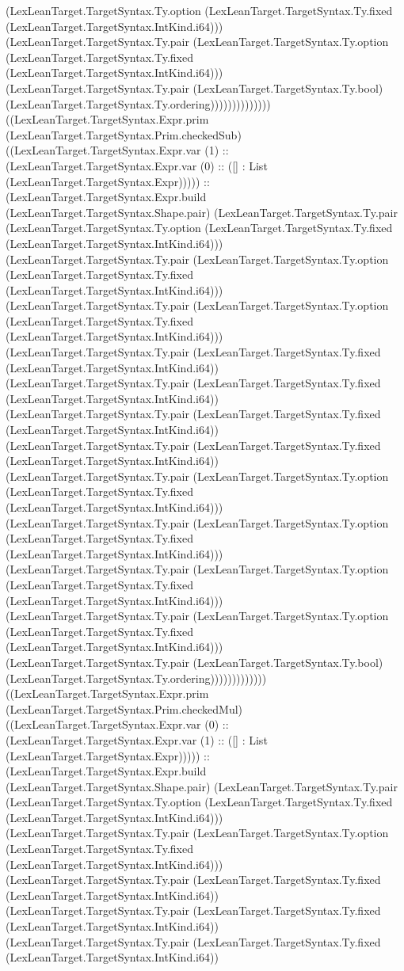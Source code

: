 \documentclass[11pt]{article}
\begin{document}
(LexLeanTarget.TargetSyntax.Ty.option (LexLeanTarget.TargetSyntax.Ty.fixed (LexLeanTarget.TargetSyntax.IntKind.i64))) (LexLeanTarget.TargetSyntax.Ty.pair (LexLeanTarget.TargetSyntax.Ty.option (LexLeanTarget.TargetSyntax.Ty.fixed (LexLeanTarget.TargetSyntax.IntKind.i64))) (LexLeanTarget.TargetSyntax.Ty.pair (LexLeanTarget.TargetSyntax.Ty.bool) (LexLeanTarget.TargetSyntax.Ty.ordering)))))))))))))) ((LexLeanTarget.TargetSyntax.Expr.prim (LexLeanTarget.TargetSyntax.Prim.checkedSub) ((LexLeanTarget.TargetSyntax.Expr.var (1) :: (LexLeanTarget.TargetSyntax.Expr.var (0) :: ([] : List (LexLeanTarget.TargetSyntax.Expr))))) :: (LexLeanTarget.TargetSyntax.Expr.build (LexLeanTarget.TargetSyntax.Shape.pair) (LexLeanTarget.TargetSyntax.Ty.pair (LexLeanTarget.TargetSyntax.Ty.option (LexLeanTarget.TargetSyntax.Ty.fixed (LexLeanTarget.TargetSyntax.IntKind.i64))) (LexLeanTarget.TargetSyntax.Ty.pair (LexLeanTarget.TargetSyntax.Ty.option (LexLeanTarget.TargetSyntax.Ty.fixed (LexLeanTarget.TargetSyntax.IntKind.i64))) (LexLeanTarget.TargetSyntax.Ty.pair (LexLeanTarget.TargetSyntax.Ty.option (LexLeanTarget.TargetSyntax.Ty.fixed (LexLeanTarget.TargetSyntax.IntKind.i64))) (LexLeanTarget.TargetSyntax.Ty.pair (LexLeanTarget.TargetSyntax.Ty.fixed (LexLeanTarget.TargetSyntax.IntKind.i64)) (LexLeanTarget.TargetSyntax.Ty.pair (LexLeanTarget.TargetSyntax.Ty.fixed (LexLeanTarget.TargetSyntax.IntKind.i64)) (LexLeanTarget.TargetSyntax.Ty.pair (LexLeanTarget.TargetSyntax.Ty.fixed (LexLeanTarget.TargetSyntax.IntKind.i64)) (LexLeanTarget.TargetSyntax.Ty.pair (LexLeanTarget.TargetSyntax.Ty.fixed (LexLeanTarget.TargetSyntax.IntKind.i64)) (LexLeanTarget.TargetSyntax.Ty.pair (LexLeanTarget.TargetSyntax.Ty.option (LexLeanTarget.TargetSyntax.Ty.fixed (LexLeanTarget.TargetSyntax.IntKind.i64))) (LexLeanTarget.TargetSyntax.Ty.pair (LexLeanTarget.TargetSyntax.Ty.option (LexLeanTarget.TargetSyntax.Ty.fixed (LexLeanTarget.TargetSyntax.IntKind.i64))) (LexLeanTarget.TargetSyntax.Ty.pair (LexLeanTarget.TargetSyntax.Ty.option (LexLeanTarget.TargetSyntax.Ty.fixed (LexLeanTarget.TargetSyntax.IntKind.i64))) (LexLeanTarget.TargetSyntax.Ty.pair (LexLeanTarget.TargetSyntax.Ty.option (LexLeanTarget.TargetSyntax.Ty.fixed (LexLeanTarget.TargetSyntax.IntKind.i64))) (LexLeanTarget.TargetSyntax.Ty.pair (LexLeanTarget.TargetSyntax.Ty.bool) (LexLeanTarget.TargetSyntax.Ty.ordering))))))))))))) ((LexLeanTarget.TargetSyntax.Expr.prim (LexLeanTarget.TargetSyntax.Prim.checkedMul) ((LexLeanTarget.TargetSyntax.Expr.var (0) :: (LexLeanTarget.TargetSyntax.Expr.var (1) :: ([] : List (LexLeanTarget.TargetSyntax.Expr))))) :: (LexLeanTarget.TargetSyntax.Expr.build (LexLeanTarget.TargetSyntax.Shape.pair) (LexLeanTarget.TargetSyntax.Ty.pair (LexLeanTarget.TargetSyntax.Ty.option (LexLeanTarget.TargetSyntax.Ty.fixed (LexLeanTarget.TargetSyntax.IntKind.i64))) (LexLeanTarget.TargetSyntax.Ty.pair (LexLeanTarget.TargetSyntax.Ty.option (LexLeanTarget.TargetSyntax.Ty.fixed (LexLeanTarget.TargetSyntax.IntKind.i64))) (LexLeanTarget.TargetSyntax.Ty.pair (LexLeanTarget.TargetSyntax.Ty.fixed (LexLeanTarget.TargetSyntax.IntKind.i64)) (LexLeanTarget.TargetSyntax.Ty.pair (LexLeanTarget.TargetSyntax.Ty.fixed (LexLeanTarget.TargetSyntax.IntKind.i64)) (LexLeanTarget.TargetSyntax.Ty.pair (LexLeanTarget.TargetSyntax.Ty.fixed (LexLeanTarget.TargetSyntax.IntKind.i64)) 
\end{document}
